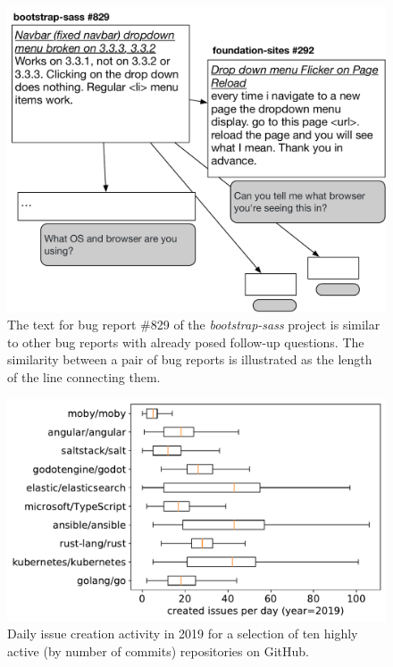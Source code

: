 \begin{figure}[t]
\centering
\includegraphics[width=0.99\linewidth]{figures/br_motivation.pdf}
\caption{The text for bug report \#829 of the {\em bootstrap-sass} project is similar to other bug reports with already posed follow-up questions. The similarity between a pair of bug reports is illustrated as the length of the line connecting them.}
\label{fig:motivation}
\end{figure}

\begin{figure}[t]
\centering
\includegraphics[width=0.99\linewidth]{figures/popular_repos.pdf}
\caption{Daily issue creation activity in 2019 for a selection of ten highly active
(by number of commits) repositories on GitHub.}
\label{fig:repo_activity}
\end{figure}

